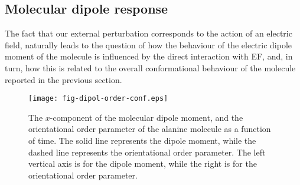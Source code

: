 \documentclass[a4paper,preprint,unsortedaddress,onecolumn]{revtex4-1}
\begin{document}
\subsection{Molecular dipole response}
The fact that our external perturbation corresponds to the action of an electric field, naturally leads to the question of how the behaviour of the electric dipole moment of the molecule is influenced by the direct interaction with EF, and, in turn, how this is related to the overall conformational behaviour of the molecule reported in the previous section.
\begin{figure}
  \centering
  \texttt{[image: fig-dipol-order-conf.eps]}
  \caption{The
    $x$-component of the molecular dipole moment, and the orientational order parameter
    of the alanine molecule as a
    function of time. The solid line represents the dipole moment,
    while the dashed line represents the orientational order parameter.
    The left vertical axis is for the dipole moment, while
    the right is for the orientational order parameter.
  }
  \label{fig:tmp3}
\end{figure}
\end{document}
